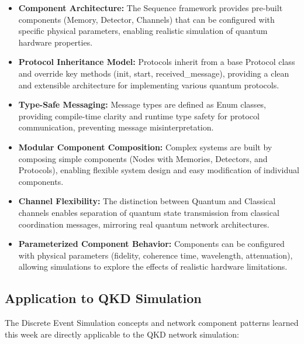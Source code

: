 \begin{itemize}
    \item \textbf{Component Architecture:} The Sequence framework provides pre-built components (Memory, Detector, Channels) that can be configured with specific physical parameters, enabling realistic simulation of quantum hardware properties.
    
    \item \textbf{Protocol Inheritance Model:} Protocols inherit from a base Protocol class and override key methods (init, start, received\_message), providing a clean and extensible architecture for implementing various quantum protocols.
    
    \item \textbf{Type-Safe Messaging:} Message types are defined as Enum classes, providing compile-time clarity and runtime type safety for protocol communication, preventing message misinterpretation.
    
    \item \textbf{Modular Component Composition:} Complex systems are built by composing simple components (Nodes with Memories, Detectors, and Protocols), enabling flexible system design and easy modification of individual components.
    
    \item \textbf{Channel Flexibility:} The distinction between Quantum and Classical channels enables separation of quantum state transmission from classical coordination messages, mirroring real quantum network architectures.
    
    \item \textbf{Parameterized Component Behavior:} Components can be configured with physical parameters (fidelity, coherence time, wavelength, attenuation), allowing simulations to explore the effects of realistic hardware limitations.
\end{itemize}
\subsection{Application to QKD Simulation}

The Discrete Event Simulation concepts and network component patterns learned this week are directly applicable to the QKD network simulation:

